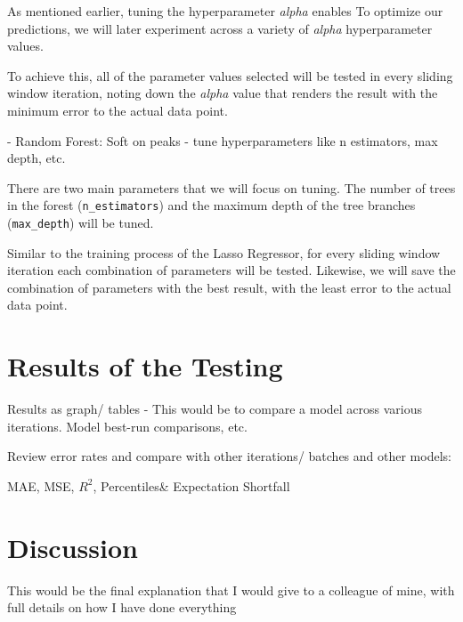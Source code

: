 \documentclass[12pt]{report} %
\begin{document}

As mentioned earlier, tuning the hyperparameter \textit{alpha} enables To optimize our predictions, we will later experiment across a variety of \textit{alpha} hyperparameter values.

To achieve this, all of the parameter values selected will be tested in every sliding window iteration, noting down the \textit{alpha} value that renders the result with the minimum error to the actual data point.


- Random Forest: Soft on peaks - tune hyperparameters like n estimators, max depth, etc.

There are two main parameters that we will focus on tuning. The number of trees in the forest (\small{\verb|n_estimators|}) and the maximum depth of the tree branches (\small{\verb|max_depth|}) will be tuned.

Similar to the training process of the Lasso Regressor, for every sliding window iteration each combination of parameters will be tested. Likewise, we will save the combination of parameters with the best result, with the least error to the actual data point.


\section{Results of the Testing}
Results as graph/ tables - This would be to compare a model across various iterations. Model best-run comparisons, etc.

Review error rates and compare with other iterations/ batches and other models:

MAE, MSE, $R^2$, Percentiles\& Expectation Shortfall


\section{Discussion} %
This would be the final explanation that I would give to a colleague of mine, with full details on how I have done everything
\end{document}
